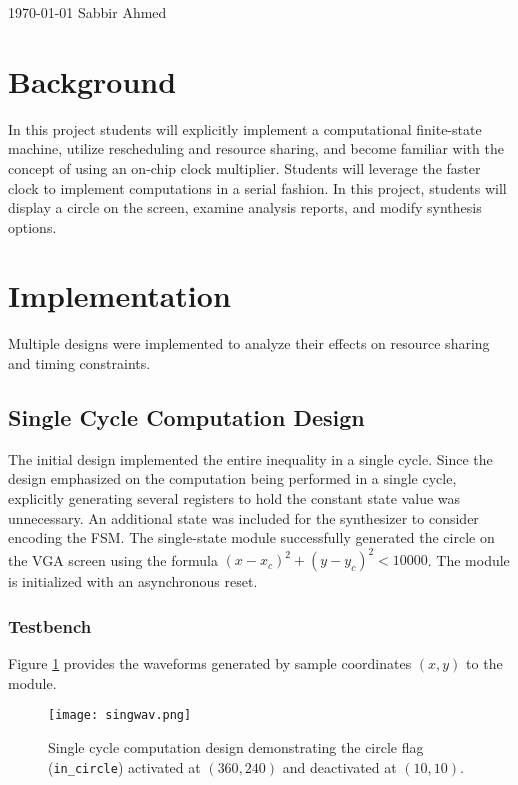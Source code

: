 \documentclass[paper=usletter, fontsize=12pt]{article}
\begin{document}
    {\today} {Sabbir Ahmed}
    \vspace{-0.1in}

    \section{Background} In this project students will explicitly implement a
    computational finite-state machine, utilize rescheduling and resource
    sharing, and become familiar with the concept of using an on-chip clock
    multiplier. Students will leverage the faster clock to implement
    computations in a serial fashion. In this project, students will display a
    circle on the screen, examine analysis reports, and modify synthesis
    options.

    \section{Implementation} Multiple designs were implemented to analyze their
    effects on resource sharing and timing constraints.

        \subsection{Single Cycle Computation Design} The initial design
        implemented the entire inequality in a single cycle. Since the design
        emphasized on the computation being performed in a single cycle,
        explicitly generating several registers to hold the constant state
        value was unnecessary. An additional state was included for the
        synthesizer to consider encoding the FSM. The single-state module
        successfully generated the circle on the VGA screen using the formula
        $(x - x_c)^2 + (y - y_c)^2 < 10000$. The module is initialized with an
        asynchronous reset.

        \subsubsection{Testbench} Figure \ref{fig:singwav} provides the
        waveforms generated by sample coordinates $(x, y)$ to the module.
        \begin{figure}[ht]
            \begin{center}
                \texttt{[image: singwav.png]}
                \caption{Single cycle computation design demonstrating the
                circle flag (\texttt{in\_circle}) activated at $(360, 240)$ and
                deactivated at $(10,10)$.}
                \label{fig:singwav}
            \end{center}
        \end{figure}
        \newpage
\end{document}
